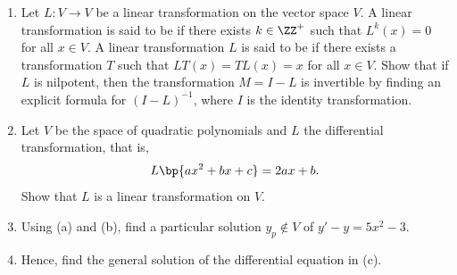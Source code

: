\begin{problem}
    \begin{enumerate}
        \item Let $L : V \to V$ be a linear transformation on the vector space $V$. A linear transformation is said to be  if there exists $k \in \ZZ^+$ such that $L^k(x) = 0$ for all $x \in V$. A linear transformation $L$ is said to be  if there exists a transformation $T$ such that $LT(x) = TL(x) = x$ for all $x \in V$. Show that if $L$ is nilpotent, then the transformation $M = I - L$ is invertible by finding an explicit formula for $(I - L)^{-1}$, where $I$ is the identity transformation.
        \item Let $V$ be the space of quadratic polynomials and $L$ the differential transformation, that is, \[L\bp{ax^2 + bx + c} = 2ax + b.\] Show that $L$ is a linear transformation on $V$.
        \item Using (a) and (b), find a particular solution $y_p \notin V$ of $y' - y = 5x^2 - 3$.
        \item Hence, find the general solution of the differential equation in (c).
    \end{enumerate}
\end{problem}
